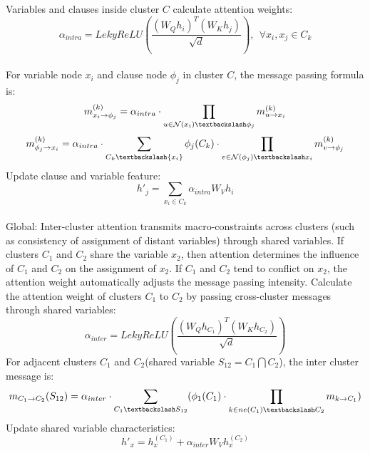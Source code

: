 Variables and clauses inside cluster \(C\) calculate attention weights:\\
\begin{equation}
\alpha_{intra}=LekyReLU(\frac{(W_Qh_i)^T(W_Kh_j)}{\sqrt{d}}),\ \ \forall x_i,x_j\in C_k
\end{equation}\\
For variable node \(x_i\) and clause node \(\phi_j\) in cluster \(C\), the message passing formula is:
\begin{equation}
    m_{x_i\rightarrow \phi_j}^{(k)}=\alpha_{intra}\cdot \prod_{u\in \mathcal N(x_i)\textbackslash \phi_j}
    m_{u\rightarrow x_i}^{(k)}
\end{equation}
\begin{equation}
     m_{\phi_j\rightarrow x_i}^{(k)}=\alpha_{intra}\cdot\sum_{C_k \textbackslash \{x_i\}}
     \phi_j(C_k)\cdot\prod_{v\in \mathcal{N}(\phi_j)\textbackslash x_i}m_{v\rightarrow \phi_j}^{(k)}
\end{equation}
Update clause and variable feature:\\
\begin{equation}
h'_j=\sum_{x_i\in C_k}\alpha_{intra}W_Vh_i
\end{equation}\\
Global: Inter-cluster attention transmits macro-constraints across clusters (such as consistency of 
assignment of distant variables) through shared variables.
If clusters \(C_1\) and \(C_2\) share the variable \(x_2\), then attention determines the influence 
of \(C_1\) and \(C_2\) on the assignment of \(x_2\). If \(C_1\) and \(C_2\) tend to conflict on \(x_2\), 
the attention weight automatically adjusts the message passing intensity.
Calculate the attention weight of clusters \(C_1\)  to \(C_2\)  by passing cross-cluster messages 
through shared variables:
\begin{equation}
\alpha_{inter}=LekyReLU(\frac{(W_Qh_{C_1})^T(W_Kh_{C_2})}{\sqrt{d}})
\end{equation}
For adjacent clusters \(C_1\) and \(C_2\)(shared variable \(S_{12}=C_1\bigcap C_2\)), the inter cluster 
message is:
\begin{equation}
    m_{C_1\rightarrow C_2}(S_{12})=\alpha_{inter}\cdot\sum_{C_1\textbackslash 
    S_{12}}(\phi_1(C_1)\cdot\prod_{k\in ne(C_1)\textbackslash C_2}m_{k\rightarrow C_1})
\end{equation}
Update shared variable characteristics:
\begin{equation}
h'_x=h_x^{(C_1)}+\alpha_{inter}W_Vh_x^{(C_2)}
\end{equation}
